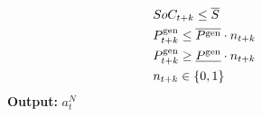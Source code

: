 \documentclass{article}
\begin{document}
\begin{algorithm}[t]
\begin{algorithmic}[1]
\begin{align}
        &SoC_{t+k} \leq \overline{S} \hspace{64pt} &&\nonumber\\
        &P^\text{gen}_{t+k} \leq \overline{P^\text{gen}} \cdot n_{t+k} \hspace{38pt} &&\nonumber\\
        &P^\text{gen}_{t+k} \geq \underline{P^\text{gen}} \cdot n_{t+k}  \hspace{38pt} &&\nonumber\\
        &n_{t+k} \in \{0, 1\}  \hspace{62pt} &&\nonumber
		\end{align}
	\STATE \textbf{Output:} $a^{N}_t$
	\end{algorithmic}
	\label{mpc}
\end{algorithm}


\end{document}
